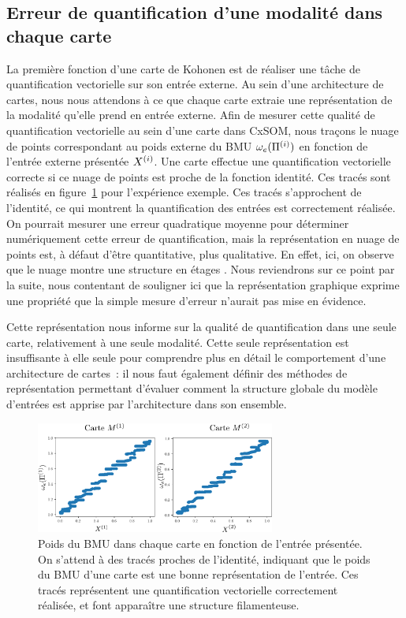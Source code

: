 \documentclass[../main]{subfiles}
\begin{document}
\subsection{Erreur de quantification d'une modalité dans chaque carte}

La première fonction d'une carte de Kohonen est de réaliser une tâche de quantification vectorielle sur son entrée externe. 
Au sein d'une architecture de cartes, nous nous attendons à ce que chaque carte extraie une représentation de la modalité qu'elle prend en entrée externe.
Afin de mesurer cette qualité de quantification vectorielle au sein d'une carte dans CxSOM, nous traçons le nuage de points correspondant au poids externe du BMU $\omega_e(\Pi^{({i})})$ en fonction de l'entrée externe présentée $X^{({i})}$. Une carte effectue une quantification vectorielle correcte si ce nuage de points est proche de la fonction identité.
Ces tracés sont réalisés en figure~\ref{fig:erreur} pour l'expérience exemple. Ces tracés s'approchent de l'identité, ce qui montrent la quantification des entrées est correctement réalisée.
On pourrait mesurer une erreur quadratique moyenne pour déterminer numériquement cette erreur de quantification, mais la représentation en nuage de points est, à défaut d'être quantitative, plus qualitative. 
En effet, ici, on observe que le nuage montre une structure \og en étages \fg{}. Nous reviendrons sur ce point par la suite, nous contentant de souligner ici que la représentation graphique exprime une propriété que la simple mesure d'erreur n'aurait pas mise en évidence.

Cette représentation nous informe sur la qualité de quantification dans une seule carte, relativement à une seule modalité. Cette seule représentation est insuffisante à elle seule pour comprendre plus en détail le comportement d'une architecture de cartes~: il nous faut également définir des méthodes de représentation permettant d'évaluer comment la structure globale du modèle d'entrées est apprise par l'architecture dans son ensemble.

\begin{figure}
    \centering
    \includegraphics[width=0.7\textwidth]{w_x.pdf}
    \caption{Poids du BMU dans chaque carte en fonction de l'entrée présentée. On s'attend à des tracés proches de l'identité, indiquant que le poids du BMU d'une carte est une bonne représentation de l'entrée. 
    Ces tracés représentent une quantification vectorielle correctement réalisée, et font apparaître une structure filamenteuse.
     \label{fig:erreur}}
\end{figure}
\end{document}
